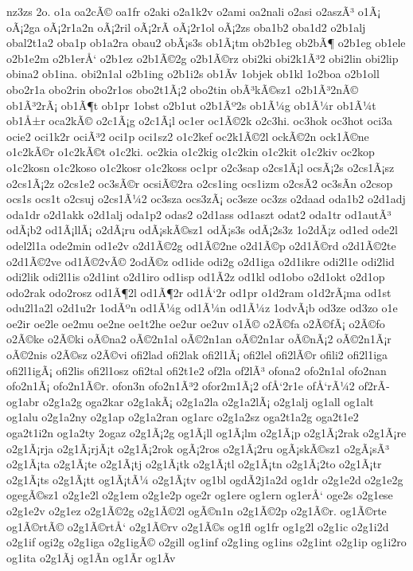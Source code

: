 {nz3zs
2o.
o1a
oa2cÃ©
oa1fr
o2aki
o2a1k2v
o2ami
oa2nali
o2asi
o2aszÃ³
o1Ã¡
oÃ¡2ga
oÃ¡2r1a2n
oÃ¡2ril
oÃ¡2rÃ­
oÃ¡2r1ol
oÃ¡2zs
oba1b2
oba1d2
o2b1alj
obal2t1a2
oba1p
ob1a2ra
obau2
obÃ¡s3s
ob1Ã¡tm
ob2b1eg
ob2bÃ¶
o2b1eg
ob1ele
o2b1e2m
o2b1erÅ‘
o2b1ez
o2b1Ã©2g
o2b1Ã©rz
obi2ki
obi2k1Ã³2
obi2lin
obi2lip
obina2
ob1ina.
obi2n1al
o2b1ing
o2b1i2s
ob1Ã­v
1objek
ob1kl
1o2boa
o2b1oll
obo2r1a
obo2rin
obo2r1os
obo2t1Ã¡2
obo2tin
obÃ³kÃ©sz1
o2b1Ã³2nÃ©
ob1Ã³2rÃ¡
ob1Ã¶t
ob1pr
1obst
o2b1ut
o2b1Ãº2s
ob1Ã¼g
ob1Ã¼r
ob1Ã¼t
ob1Å±r
oca2kÃ©
o2c1Ã¡g
o2c1Ã¡l
oc1er
oc1Ã©2k
o2c3hi.
oc3hok
oc3hot
oci3a
ocie2
oci1k2r
ociÃ³2
oci1p
oci1sz2
o1c2kef
oc2k1Ã©2l
ockÃ©2n
ock1Ã©ne
o1c2kÃ©r
o1c2kÃ©t
o1c2ki.
oc2kia
o1c2kig
o1c2kin
o1c2kit
o1c2kiv
oc2kop
o1c2kosn
o1c2koso
o1c2kosr
o1c2koss
oc1pr
o2c3sap
o2cs1Ã¡l
ocsÃ¡2s
o2cs1Ã¡sz
o2cs1Ã¡2z
o2cs1e2
oc3sÃ©r
ocsiÃ©2ra
o2cs1ing
ocs1izm
o2csÃ­2
oc3sÃ­n
o2csop
ocs1s
ocs1t
o2csuj
o2cs1Ã¼2
oc3sza
ocs3zÃ¡
oc3sze
oc3zs
o2daad
oda1b2
o2d1adj
oda1dr
o2d1akk
o2d1alj
oda1p2
odas2
o2d1ass
od1aszt
odat2
oda1tr
od1autÃ³
odÃ¡b2
od1Ã¡llÃ¡
o2dÃ¡ru
odÃ¡skÃ©sz1
odÃ¡s3s
odÃ¡2s3z
1o2dÃ¡z
od1ed
ode2l
odel2l1a
ode2min
od1e2v
o2d1Ã©2g
od1Ã©2ne
o2d1Ã©p
o2d1Ã©rd
o2d1Ã©2te
o2d1Ã©2ve
od1Ã©2vÃ©
2odÃ©z
od1ide
odi2g
o2d1iga
o2d1ikre
odi2l1e
odi2lid
odi2lik
odi2l1is
o2d1int
o2d1iro
od1isp
od1Ã­2z
od1kl
od1obo
o2d1okt
o2d1op
odo2rak
odo2rosz
od1Ã¶2l
od1Ã¶2r
od1Å‘2r
od1pr
o1d2ram
o1d2rÃ¡ma
od1st
odu2l1a2l
o2d1u2r
1odÃºn
od1Ã¼g
od1Ã¼n
od1Ã¼z
1odvÃ¡b
od3ze
od3zo
o1e
oe2ir
oe2le
oe2mu
oe2ne
oe1t2he
oe2ur
oe2uv
o1Ã©
o2Ã©fa
o2Ã©fÃ¡
o2Ã©fo
o2Ã©ke
o2Ã©ki
oÃ©na2
oÃ©2n1al
oÃ©2n1an
oÃ©2n1ar
oÃ©nÃ¡2
oÃ©2n1Ã¡r
oÃ©2nis
o2Ã©sz
o2Ã©vi
ofi2lad
ofi2lak
ofi2l1Ã¡
ofi2lel
ofi2lÃ©r
ofili2
ofi2l1iga
ofi2l1igÃ¡
ofi2lis
ofi2l1osz
ofi2tal
ofi2t1e2
of2la
of2lÃ³
ofona2
ofo2n1al
ofo2nan
ofo2n1Ã¡
ofo2n1Ã©r.
ofon3n
ofo2n1Ã³2
ofor2m1Ã¡2
ofÅ‘2r1e
ofÅ‘rÃ¼2
of2rÃ­
og1abr
o2g1a2g
oga2kar
o2g1akÃ¡
o2g1a2la
o2g1a2lÃ¡
o2g1alj
og1all
og1alt
og1alu
o2g1a2ny
o2g1ap
o2g1a2ran
og1arc
o2g1a2sz
oga2t1a2g
oga2t1e2
oga2t1i2n
og1a2ty
2ogaz
o2g1Ã¡2g
og1Ã¡ll
og1Ã¡lm
o2g1Ã¡p
o2g1Ã¡2rak
o2g1Ã¡re
o2g1Ã¡rja
o2g1Ã¡rjÃ¡t
o2g1Ã¡2rok
ogÃ¡2ros
o2g1Ã¡2ru
ogÃ¡skÃ©sz1
o2gÃ¡sÃ³
o2g1Ã¡ta
o2g1Ã¡te
o2g1Ã¡tj
o2g1Ã¡tk
o2g1Ã¡tl
o2g1Ã¡tn
o2g1Ã¡2to
o2g1Ã¡tr
o2g1Ã¡ts
o2g1Ã¡tt
og1Ã¡tÃ¼
o2g1Ã¡tv
og1bl
ogdÃ­2j1a2d
og1dr
o2g1e2d
o2g1e2g
ogegÃ©sz1
o2g1e2l
o2g1em
o2g1e2p
oge2r
og1ere
og1ern
og1erÅ‘
oge2s
o2g1ese
o2g1e2v
o2g1ez
o2g1Ã©2g
o2g1Ã©2l
ogÃ©n1n
o2g1Ã©2p
o2g1Ã©r.
og1Ã©rte
og1Ã©rtÃ©
o2g1Ã©rtÅ‘
o2g1Ã©rv
o2g1Ã©s
og1fl
og1fr
og1g2l
o2g1ic
o2g1i2d
o2g1if
ogi2g
o2g1iga
o2g1igÃ©
o2gill
og1inf
o2g1ing
og1ins
o2g1int
o2g1ip
og1i2ro
og1ita
o2g1Ã­j
og1Ã­n
og1Ã­r
og1Ã­v
}

